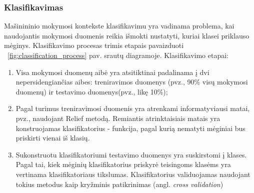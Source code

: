 
\subsubsection{Klasifikavimas}

Mašinininio mokymosi kontekste klasifikavimu yra vadinama problema, kai naudojantis mokymosi duomenis reikia išmokti nustatyti, kuriai klasei priklauso mėginys. Klasifikavimo procesas trimis etapais pavaizduoti ~\ref{fig:classification_process} pav. srautų diagramoje. Klasifikavimo etapai:
\begin{enumerate}
 \item Visa mokymosi duomenų aibė yra atsitiktinai padalinama į dvi nepersidengiančias aibes: treniravimos duomenys (pvz., 90\% visų mokymosi duomenų) ir testavimo duomenys(pvz., likę 10\%);
 \item Pagal turimus treniravimosi duomenis yra atrenkami informatyviausi matai, pvz., naudojant Relief metodą. Remiantis atrinktaisiais matais yra konstruojamas klasifikatorius - funkcija, pagal kurią nematyti mėginiai bus priskirti vienai iš klasių.
 \item Sukonstruotu klasifikatoriumi testavimo duomenys yra suskirstomi į klases. Pagal tai, kiek mėginių klasifikatorius priskyrė teisingoms klasėms yra vertinama klasifikatoriaus tikslumas. Klasifikatorius validuojamas naudojant tokius metodus kaip kryžminis patikrinimas (angl. \textit{cross validation})
\end{enumerate}

